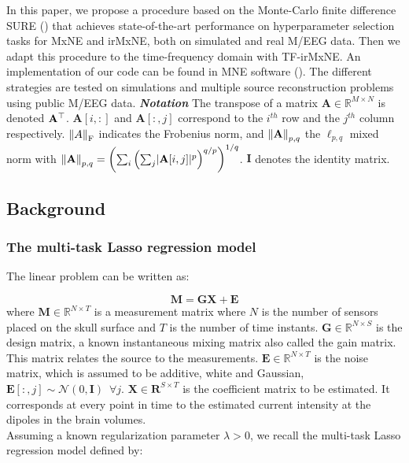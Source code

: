 In this paper, we propose a procedure based on the Monte-Carlo finite difference SURE (\cite{Deledalle_Vaiter_Fadili_Peyre14})
that achieves state-of-the-art performance on hyperparameter selection tasks for MxNE and irMxNE,
both on simulated and real M/EEG data. Then we adapt this procedure to the time-frequency domain
with TF-irMxNE. An implementation of our code can be found in MNE software (\cite{mne}).
The different strategies are tested on simulations and multiple source reconstruction 
problems using public M/EEG data.
%
\newline
\newline
%
\textit{\textbf{Notation}} The transpose of a matrix $\mathbf{A} \in \mathbb{R}^{M \times N}$ is
denoted $\bf{A}^\top$. $\mathbf{A}[i,:]$ and $\mathbf{A}[:,j]$ correspond to the $i^{th}$
row and the $j^{th}$ column respectively. $\left \lVert A \right \rVert_{\text{F}}$ indicates the Frobenius norm,
and $\left \lVert \mathbf{A} \right \rVert_{p,q}$ the $\ell_{p,q}$ mixed norm with $\left \lVert \mathbf{A} \right \rVert_{p,q} 
= \left(\sum_i \left(\sum_j \lvert \mathbf{A}[i,j] \rvert^p\right)^{q/p}\right)^{1/q}$.
$\mathbf{I}$ denotes the identity matrix.


\subsection{Background}
\label{sub:background}
%

\subsubsection{The multi-task Lasso regression model}

The linear problem can be written as:

\begin{equation}
    \mathbf{M = GX + E} 
\end{equation}
%
where $\mathbf{M} \in \mathbb{R}^{N \times T}$ is a measurement matrix where $N$ is the
number of sensors placed on the skull surface and $T$ is the number of time instants.
$\mathbf{G} \in \mathbb{R}^{N \times S}$ is the design matrix, a known 
instantaneous mixing matrix also called the gain matrix. This matrix relates the source
to the measurements. $\mathbf{E} \in \mathbb{R}^{N \times T}$ is the noise matrix, which
is assumed to be additive, white and Gaussian, $\mathbf{E}[:,j] \sim \mathcal{N}(0, \mathbf{I})
\enspace \forall j$. $\mathbf{X} \in \mathbf{R}^{S \times T}$ is the coefficient matrix to be estimated. 
It corresponds at every point in time to the estimated current intensity at the dipoles in
the brain volumes.
\\
Assuming a known regularization parameter $\lambda > 0$, we recall the multi-task
Lasso regression model defined by:

